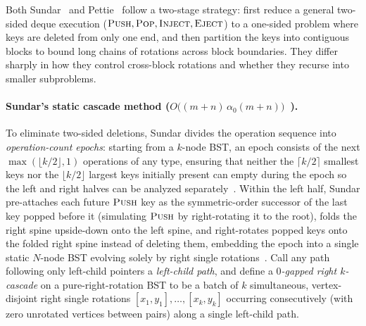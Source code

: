 \documentclass[11pt]{article}
\theoremstyle{definition}
\theoremstyle{remark}
\newcommand{\PUSH}{\textnormal{\scshape Push}}
\newcommand{\POP}{\textnormal{\scshape Pop}}
\newcommand{\INJECT}{\textnormal{\scshape Inject}}
\newcommand{\EJECT}{\textnormal{\scshape Eject}}
\begin{document}
Both Sundar~\cite{Sundar1992} and Pettie~\cite{Pettie2008} follow a two-stage strategy: first reduce a general two-sided deque execution ($\PUSH, \POP, \INJECT, \EJECT$) to a one-sided problem where keys are deleted from only one end, and then partition the keys into contiguous blocks to bound long chains of rotations across block boundaries. They differ sharply in how they control cross-block rotations and whether they recurse into smaller subproblems.

\paragraph{Sundar's static cascade method ($O\big((m + n)\,\alpha_0(m + n)\big)$~\cite{Sundar1992}).}
To eliminate two-sided deletions, Sundar divides the operation sequence into \emph{operation-count epochs}: starting from a $k$-node BST, an epoch consists of the next $\max(\lfloor k/2 \rfloor, 1)$ operations of any type, ensuring that neither the $\lceil k/2 \rceil$ smallest keys nor the $\lfloor k/2 \rfloor$ largest keys initially present can empty during the epoch so the left and right halves can be analyzed separately~\cite[Section~3, Theorem~7]{Sundar1992}. Within the left half, Sundar pre-attaches each future $\PUSH$ key as the symmetric-order successor of the last key popped before it (simulating $\PUSH$ by right-rotating it to the root), folds the right spine upside-down onto the left spine, and right-rotates popped keys onto the folded right spine instead of deleting them, embedding the epoch into a single static $N$-node BST evolving solely by right single rotations~\cite[Section~3, Lemma~10]{Sundar1992}. Call any path following only left-child pointers a \emph{left-child path}, and define a \emph{$0$-gapped right $k$-cascade} on a pure-right-rotation BST to be a batch of $k$ simultaneous, vertex-disjoint right single rotations $[x_1, y_1], \dots, [x_k, y_k]$ occurring consecutively (with zero unrotated vertices between pairs) along a single left-child path.
\end{document}
